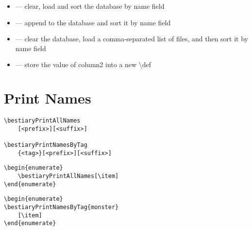 \documentclass[itdr]{subfiles}
\begin{document}
\begin{minipage}{\textwidth}
\begin{itemize}
	\item {} --- clear, load and sort the database by name field
	\item {} --- append to the database and sort it by name field
	\item {} --- clear the database, load a comma-separated list of files, and then sort it by name field
	\item {} --- store the value of column2 into a new \textbackslash{}def
\end{itemize}

\end{minipage}

\vfill
\clearpage

\section{Print Names}

\begin{lstlisting}
\bestiaryPrintAllNames
	[<prefix>][<suffix>]

\bestiaryPrintNamesByTag
	{<tag>}[<prefix>][<suffix>]
\end{lstlisting}

\begin{lstlisting}
\begin{enumerate}
	\bestiaryPrintAllNames[\item]
\end{enumerate}
\end{lstlisting}

\begin{enumerate}
	\bestiaryPrintAllNames[\item]
\end{enumerate}

\vfill
\break

\begin{lstlisting}
\begin{enumerate}
\bestiaryPrintNamesByTag{monster}
	[\item]
\end{enumerate}
\end{lstlisting}
\end{document}
